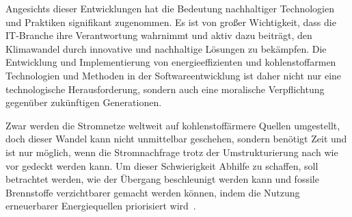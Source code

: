 Angesichts dieser Entwicklungen hat die Bedeutung nachhaltiger Technologien und Praktiken signifikant zugenommen.
Es ist von großer Wichtigkeit, dass die \ac{IT}-Branche ihre Verantwortung wahrnimmt und aktiv dazu beiträgt, den Klimawandel durch innovative und nachhaltige Lösungen zu bekämpfen.
Die Entwicklung und Implementierung von energieeffizienten und kohlenstoffarmen Technologien und Methoden in der Softwareentwicklung ist daher nicht nur eine technologische Herausforderung, sondern auch eine moralische Verpflichtung gegenüber zukünftigen Generationen.

Zwar werden die Stromnetze weltweit auf kohlenstoffärmere Quellen umgestellt, doch dieser Wandel kann nicht unmittelbar geschehen, sondern benötigt Zeit und ist nur möglich, wenn die Stromnachfrage trotz der Umstrukturierung nach wie vor gedeckt werden kann.
Um dieser Schwierigkeit Abhilfe zu schaffen, soll betrachtet werden, wie der Übergang beschleunigt werden kann und fossile Brennstoffe verzichtbarer gemacht werden können, indem die Nutzung erneuerbarer Energiequellen priorisiert wird~\cite{GreenSoftwareFoundation.2022}.

